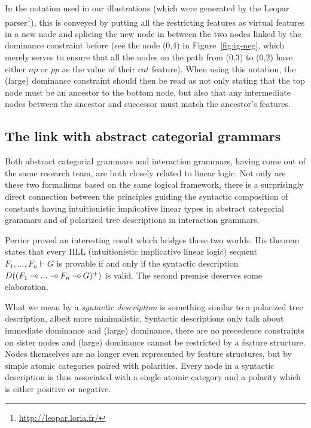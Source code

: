 In the notation used in our illustrations (which were generated by the
Leopar parser\footnote{\url{http://leopar.loria.fr/}}), this is conveyed
by putting all the restricting features as virtual features in a new
node and splicing the new node in between the two nodes linked by the
dominance constraint before (see the node (0,4) in
Figure~\ref{fig:ig-neg}, which merely serves to ensure that all the
nodes on the path from (0,3) to (0,2) have either $np$ or $pp$ as the
value of their $cat$ feature). When using this notation, the (large)
dominance constraint should then be read as not only stating that the
top node must be an ancestor to the bottom node, but also that any
intermediate nodes between the ancestor and successor must match the
ancestor's features.

\subsection{The link with abstract categorial grammars}
\label{ssec:link-ig-acg}

Both abstract categorial grammars and interaction grammars, having come
out of the same research team, are both closely related to linear
logic. Not only are these two formalisms based on the same logical
framework, there is a surprisingly direct connection between the
principles guiding the syntactic composition of constants having
intuitionistic implicative linear types in abstract categorial grammars
and of polarized tree descriptions in interaction grammars.

Perrier \cite{perrier1999intuitionistic} proved an interesting result
which bridges these two worlds. His theorem states that every IILL
(intuitionistic implicative linear logic) sequent $F_1, ..., F_n \vdash
G$ is provable if and only if the syntactic description $D((F_1 \mathbin{{-}\mkern-3.5mu{\circ}}
... \mathbin{{-}\mkern-3.5mu{\circ}} F_n \mathbin{{-}\mkern-3.5mu{\circ}} G)^+)$ is valid. The second premise deserves some
elaboration.

What we mean by a \emph{syntactic description} is something similar to a
polarized tree description, albeit more minimalistic. Syntactic
descriptions only talk about immediate dominance and (large) dominance,
there are no precedence constraints on sister nodes and (large)
dominance cannot be restricted by a feature structure. Nodes themselves
are no longer even represented by feature structures, but by simple
atomic categories paired with polarities. Every node in a syntactic
description is thus associated with a single atomic category and a
polarity which is either positive or negative.

